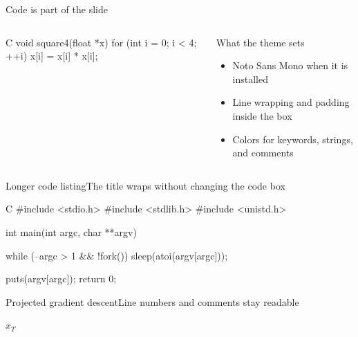 \documentclass[aspectratio=169]{beamer}
\begin{document}
\begin{frame}[fragile]{Code is part of the slide}
  \begin{columns}[T,onlytextwidth]
      \begin{cookiecode}[title=Scalar C]{C}
void square4(float *x) {
  for (int i = 0; i < 4; ++i) {
    x[i] = x[i] * x[i];
  }
}
      \end{cookiecode}

      \begin{block}{What the theme sets}
        \begin{itemize}
          \item Noto Sans Mono when it is installed
          \item Line wrapping and padding inside the box
          \item Colors for keywords, strings, and comments
        \end{itemize}
      \end{block}

       \hspace{.25em}
  \end{columns}
\end{frame}

\begin{frame}[fragile]{Longer code listing}{The title wraps without changing the code box}
  \begin{cookiecode}[title=Sleep sort sketch]{C}
#include <stdio.h>
#include <stdlib.h>
#include <unistd.h>

int main(int argc, char **argv) {
  while (--argc > 1 && !fork())
    sleep(atoi(argv[argc]));

  puts(argv[argc]);
  return 0;
}
  \end{cookiecode}
\end{frame}

\begin{frame}{Projected gradient descent}{Line numbers and comments stay readable}
  \begin{algorithm}[H]
    \caption{Projected gradient descent}
    \Return $x_T$\;
  \end{algorithm}
\end{frame}
\end{document}
